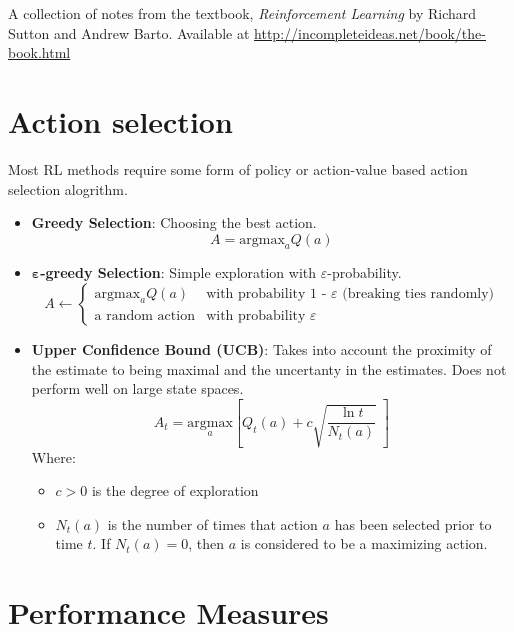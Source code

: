 \documentclass[12pt]{article}
\begin{document}
A collection of notes from the textbook, 
\textit{Reinforcement Learning} by Richard Sutton and Andrew Barto.
Available at \url{http://incompleteideas.net/book/the-book.html}

\section{Action selection}
Most RL methods require some form of policy or action-value based action selection alogrithm.
\begin{itemize}
\item\textbf{Greedy Selection}: Choosing the best action.
\[A = \text{argmax}_aQ(a) \]

\item$\boldsymbol\varepsilon$\textbf{-greedy Selection}: Simple exploration with $\varepsilon$-probability.
\[
	A\leftarrow
	\begin{cases}
		\text{argmax}_aQ(a) & \text{with probability 1 - $\varepsilon$ (breaking ties randomly)} \\
		\text{a random action} & \text{with probability } \varepsilon
	\end{cases}
\]
\item\textbf{Upper Confidence Bound (UCB)}: Takes into account the proximity of the estimate to being maximal and the uncertanty in the estimates. Does not perform well on large state spaces.
\[
	A_t=\underset{a}{\text{argmax}} 
	\left[
		Q_t(a) + c \sqrt{\frac{\ln{t}}{N_t(a)}}\;
	\right]
\]
Where:
	\begin{itemize}
		\item $c > 0$ is the degree of exploration
		\item $N_t(a)$ is the number of times that action $a$ has been selected prior to time $t$.
			If $N_t(a)=0$, then $a$ is considered to be a maximizing action.
	\end{itemize}
\end{itemize}

\section{Performance Measures}
\end{document}
